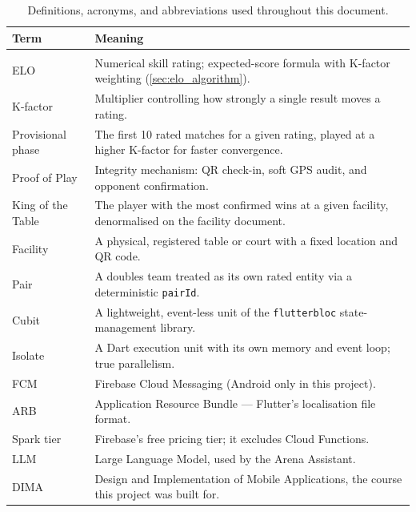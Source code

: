 \documentclass{configurations/polimi3i_thesis}
\renewcommand{\_}{\textunderscore\allowbreak}
\begin{document}
\begin{table}[H]
    \centering
    \small
    \begin{tabularx}{\textwidth}{l X}
        \textbf{Term} & \textbf{Meaning} \\\hline\\[-9px]
        ELO & Numerical skill rating; expected-score formula with K-factor weighting (\cref{sec:elo_algorithm}). \\[2px]
        K-factor & Multiplier controlling how strongly a single result moves a rating. \\[2px]
        Provisional phase & The first 10 rated matches for a given rating, played at a higher K-factor for faster convergence. \\[2px]
        Proof of Play & Integrity mechanism: QR check-in, soft GPS audit, and opponent confirmation. \\[2px]
        King of the Table & The player with the most confirmed wins at a given facility, denormalised on the facility document. \\[2px]
        Facility & A physical, registered table or court with a fixed location and QR code. \\[2px]
        Pair & A doubles team treated as its own rated entity via a deterministic \texttt{pairId}. \\[2px]
        Cubit & A lightweight, event-less unit of the \texttt{flutter\_bloc} state-management library. \\[2px]
        Isolate & A Dart execution unit with its own memory and event loop; true parallelism. \\[2px]
        FCM & Firebase Cloud Messaging (Android only in this project). \\[2px]
        ARB & Application Resource Bundle — Flutter's localisation file format. \\[2px]
        Spark tier & Firebase's free pricing tier; it excludes Cloud Functions. \\[2px]
        LLM & Large Language Model, used by the Arena Assistant. \\[2px]
        DIMA & Design and Implementation of Mobile Applications, the course this project was built for. \\[2px]
    \end{tabularx}
    \caption{Definitions, acronyms, and abbreviations used throughout this document.}
    \label{tab:definitions}
\end{table}

\end{document}
